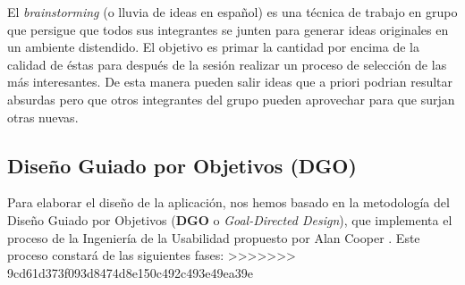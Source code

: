   El \textit{brainstorming} \cite{ref:bookBrainStorming} (o lluvia de ideas en español) es una técnica de trabajo en grupo que persigue que todos sus integrantes se junten para generar ideas originales en un ambiente distendido. El objetivo es primar la cantidad por encima de la calidad de éstas para después de la sesión realizar un proceso de selección de las más interesantes. De esta manera pueden salir ideas que a priori podrian resultar absurdas pero que otros integrantes del grupo pueden aprovechar para que surjan otras nuevas.  
  
  \subsection{Diseño Guiado por Objetivos (DGO)}\label{ssec:dgoDesign}
  
  Para elaborar el diseño de la aplicación, nos hemos basado en la metodología del Diseño Guiado por Objetivos (\textbf{DGO} o \textit{Goal-Directed Design}), que implementa el proceso de la Ingeniería de la Usabilidad propuesto por Alan Cooper \cite{ref:bookAlanCooper}. Este proceso constará de las siguientes fases:
>>>>>>> 9cd61d373f093d8474d8e150c492c493e49ea39e

